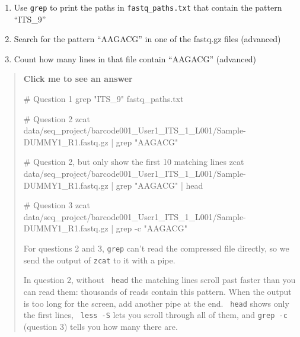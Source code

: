 \documentclass[
  letterpaper,
  DIV=11,
  numbers=noendperiod]{scrreprt}
\newenvironment{Shaded}{}{}
\newcommand{\AttributeTok}[1]{\textcolor[rgb]{0.84,0.23,0.29}{#1}}
\newcommand{\CommentTok}[1]{\textcolor[rgb]{0.42,0.45,0.49}{#1}}
\newcommand{\FunctionTok}[1]{\textcolor[rgb]{0.44,0.26,0.76}{#1}}
\newcommand{\KeywordTok}[1]{\textcolor[rgb]{0.84,0.23,0.29}{#1}}
\newcommand{\NormalTok}[1]{\textcolor[rgb]{0.14,0.16,0.18}{#1}}
\newcommand{\StringTok}[1]{\textcolor[rgb]{0.01,0.18,0.38}{#1}}
\providecommand{\tightlist}{%
  \setlength{\itemsep}{0pt}\setlength{\parskip}{0pt}}
\begin{document}
\begin{tcolorbox}[enhanced jigsaw, coltitle=black, breakable, titlerule=0mm, colback=white, rightrule=.15mm, bottomrule=.15mm, toprule=.15mm, colframe=quarto-callout-color-frame, colbacktitle=quarto-callout-color!10!white, bottomtitle=1mm, opacitybacktitle=0.6, toptitle=1mm, leftrule=.75mm, arc=.35mm, title=\textcolor{quarto-callout-color}{\faInfo}\hspace{0.5em}{Exercise}, left=2mm, opacityback=0]

\begin{enumerate}
\def\labelenumi{\arabic{enumi}.}
\tightlist
\item
  Use \texttt{grep} to print the paths in \texttt{fastq\_paths.txt} that
  contain the pattern ``ITS\_9''
\item
  Search for the pattern ``AAGACG'' in one of the fastq.gz files
  (advanced)
\item
  Count how many lines in that file contain ``AAGACG'' (advanced)
\end{enumerate}

\begin{quote}
\textbf{Click me to see an answer}

\begin{Shaded}
\begin{Highlighting}[]
\CommentTok{\# Question 1}
\FunctionTok{grep} \StringTok{"ITS\_9"}\NormalTok{ fastq\_paths.txt}

\CommentTok{\# Question 2}
\FunctionTok{zcat}\NormalTok{ data/seq\_project/barcode001\_User1\_ITS\_1\_L001/Sample{-}DUMMY1\_R1.fastq.gz }\KeywordTok{|} \FunctionTok{grep} \StringTok{"AAGACG"}

\CommentTok{\# Question 2, but only show the first 10 matching lines}
\FunctionTok{zcat}\NormalTok{ data/seq\_project/barcode001\_User1\_ITS\_1\_L001/Sample{-}DUMMY1\_R1.fastq.gz }\KeywordTok{|} \FunctionTok{grep} \StringTok{"AAGACG"} \KeywordTok{|} \FunctionTok{head}

\CommentTok{\# Question 3}
\FunctionTok{zcat}\NormalTok{ data/seq\_project/barcode001\_User1\_ITS\_1\_L001/Sample{-}DUMMY1\_R1.fastq.gz }\KeywordTok{|} \FunctionTok{grep} \AttributeTok{{-}c} \StringTok{"AAGACG"}
\end{Highlighting}
\end{Shaded}

For questions 2 and 3, \texttt{grep} can't read the compressed file
directly, so we send the output of \texttt{zcat} to it with a pipe.

In question 2, without \texttt{\textbar{}\ head} the matching lines
scroll past faster than you can read them: thousands of reads contain
this pattern. When the output is too long for the screen, add another
pipe at the end. \texttt{\textbar{}\ head} shows only the first lines,
\texttt{\textbar{}\ less\ -S} lets you scroll through all of them, and
\texttt{grep\ -c} (question 3) tells you how many there are.


\end{quote}
\end{tcolorbox}
\end{document}

